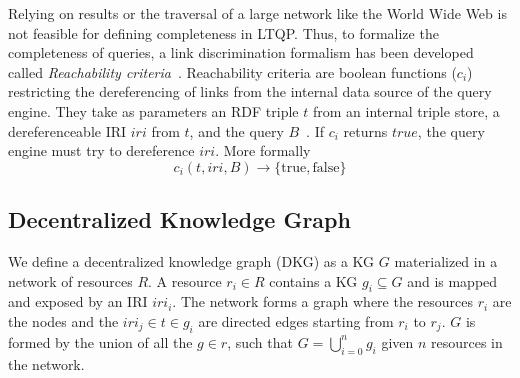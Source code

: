 Relying on results or the traversal of a large network like the World Wide Web is not feasible for defining completeness in LTQP.
Thus, to formalize the completeness of queries, a link discrimination formalism has been developed called \emph{Reachability criteria}~\cite{Hartig2012}.
Reachability criteria are boolean functions ($c_i$) restricting the dereferencing of links from the internal data source of the query engine.
They take as parameters an RDF triple $t$ from an internal triple store, a dereferenceable IRI $iri$ from $t$, and the query $B$~\cite{Hartig2012}.
If $c_i$ returns $true$, the query engine must try to dereference $iri$.
More formally
\begin{equation}\label{eq:reachabilityCriteria}
c_i(t, iri, B) \rightarrow \{\mathrm{true}, \mathrm{false}\}
\end{equation}

\subsection{Decentralized Knowledge Graph}

We define a decentralized knowledge graph (DKG) as a KG $G$ materialized in a network of resources $R$.
A resource $r_i \in R$ contains a KG $g_i \subseteq G$ and is mapped and exposed by an IRI $iri_i$.
The network forms a graph where the resources $r_i$ are the nodes and the $iri_j \in t \in g_i$ are directed edges starting from $r_i$ to $r_j$.
$G$ is formed by the union of all the $g \in r$, such that $G = \bigcup_{i=0}^{n}g_i$ given $n$ resources in the network.